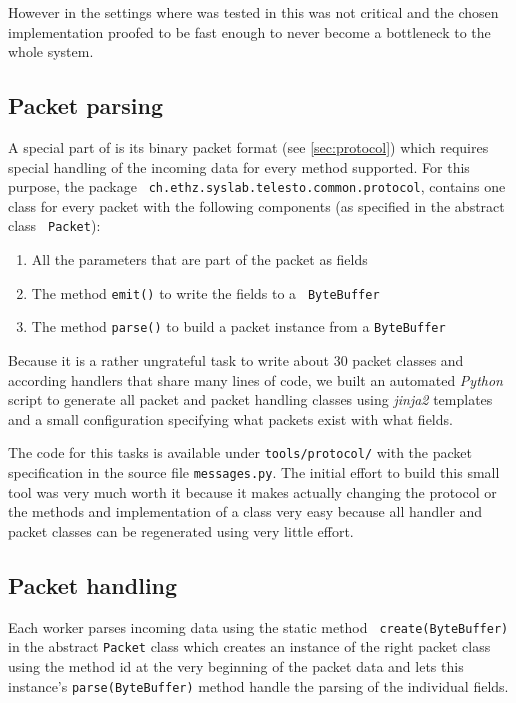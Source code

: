\documentclass[a4paper, oneside]{csthesis}
\begin{document}
    However in the settings where \telesto{} was tested in this was not critical
    and the chosen implementation proofed to be fast enough to never become a
    bottleneck to the whole system.
    
    
\subsection{Packet parsing}
    A special part of \telesto{} is its binary packet format (see
    \cref{sec:protocol}) which requires special handling of the incoming data
    for every method supported. For this purpose, the package {\tt
    ch.ethz.syslab.telesto.common.protocol}, contains one class for every packet
    with the following components (as specified in the abstract class {\tt
    Packet}):
    
    \begin{enumerate}
        \item All the parameters that are part of the packet as fields
        \item The method {\tt emit()} to write the fields to a {\tt
        ByteBuffer}
        \item The method {\tt parse()} to build a packet instance from
        a {\tt ByteBuffer}
    \end{enumerate}

    Because it is a rather ungrateful task to write about $30$ packet classes
    and according handlers that share many lines of code, we built an automated
    {\it Python}
    script to generate all packet and packet handling classes using {\it
    jinja2} templates
    and a small configuration specifying what packets exist with what fields.
    
    The code for this tasks is available under {\tt tools/protocol/} with the
    packet specification in the source file {\tt messages.py}. The initial
    effort to build this small tool was very much worth it because it makes
    actually changing the protocol or the methods and implementation of a class
    very easy because all handler and packet classes can be regenerated using
    very little effort.
    
\subsection{Packet handling}
    Each worker parses incoming data using the static method {\tt
    create(ByteBuffer)} in the abstract {\tt Packet} class which creates an
    instance of the right packet class using the method id at the very beginning
    of the packet data and lets this instance's {\tt parse(ByteBuffer)} method
    handle the parsing of the individual fields.
    
\end{document}
